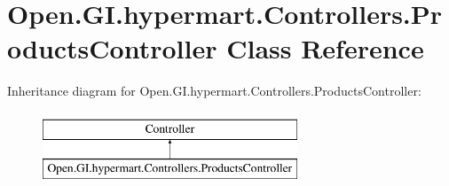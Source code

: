 \hypertarget{class_open_1_1_g_i_1_1hypermart_1_1_controllers_1_1_products_controller}{}\section{Open.\+G\+I.\+hypermart.\+Controllers.\+Products\+Controller Class Reference}
\label{class_open_1_1_g_i_1_1hypermart_1_1_controllers_1_1_products_controller}


 


Inheritance diagram for Open.\+G\+I.\+hypermart.\+Controllers.\+Products\+Controller\+:\begin{figure}[H]
\begin{center}
\leavevmode
\includegraphics[height=2.000000cm]{class_open_1_1_g_i_1_1hypermart_1_1_controllers_1_1_products_controller}
\end{center}
\end{figure}
